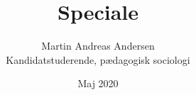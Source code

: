 \documentclass[a4paper]{article}
\author{Martin Andreas Andersen \\ Kandidatstuderende, pædagogisk sociologi}
\title{Speciale}
\date{Maj 2020}
\begin{document}
\pagestyle{empty}
\renewcommand{\thesection}{\Roman{section}}
\setlength{}
\renewcommand{\textflush}{flushepinormal}
\renewcommand{\epigraphsize}{\footnotesize}







\newpage

\newpage

\newpage

\newpage


\end{document}
